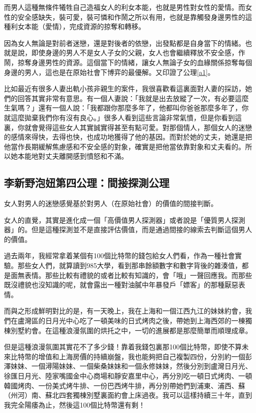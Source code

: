 而男人這種無條件犧牲自己造福女人的利女本能，也就是男性對女性的愛情。而女性的安全感缺失，裝可愛，裝可憐和作鬧之所以有用，也就是靠觸發身邊男性的這種利女本能（愛情），完成資源的掠奪和轉移。

因為女人無論是對前者迷戀，還是對後者的依戀，出發點都是自身當下的情緒。也就是說，即使身邊的男人不是女人子女的父親，女人也會繼續釋放不安全感，作鬧，掠奪身邊男性的資源。這個當下的情緒，讓女人無論子女的血緣關係掠奪每個身邊的男人，這也是在原始社會下博弈的最優解。又印證了公理\ref{a1}。

比如最近有很多人妻出軌小孩非親生的案件，我很喜歡看這裏面對人妻的採訪，她們的回答其實非常有意思。有一個人妻說：「我就是出去放縱了一次，有必要這麼生氣嗎？」還有一個人說：「我都跟你那麼多年了，他都叫你爸爸那麼多年了，你就這麼拋棄我們你有沒有良心。」很多人看到這些言論非常氣憤，但是你看到這裏，你就會覺得這些女人其實誠實得甚至有點可愛。對那個情人，那個女人的迷戀的感情來得快，去得也快，也成功地獲得了他的基因。而對於她的丈夫，她還是把他當作長期緩解焦慮感和不安全感的對象，確實是把他當依靠對象和丈夫看的。所以她本能地對丈夫離開感到憤怒和不滿。

\subsection{李新野泡妞第四公理：間接探測公理}

\begin{axiom}\label{a4}
女人對男人的迷戀感覺基於對男人（在原始社會）的價值的間接判斷。
\end{axiom}

女人的直覺，其實是進化成一個「高價值男人探測器」或者說是「優質男人探測器」的。但是這種探測並不是直接評估價值，而是通過間接的線索去判斷這個男人的價值。

過去兩年，我經常拿着某個有100個比特幣的錢包給女人們看，作為一種社會實驗。那些女人們，就算讀到985大學，看到那串餘額數字和數字背後的雜湊值，都是面無表情。那些比較有禮貌的或者比較有知識的，會「哦」一聲回應我。而那些既沒禮貌也沒知識的呢，就會露出一種對油膩中年暴發戶「嫖客」的那種厭惡表情。

而與之形成鮮明對比的是，有一天晚上，我在上海和一個江西九江的妹妹約會，我們在盧灣區的日月光中心吃了一頓美味的日式烤肉之後，帶她到上海西郊的一棟獨棟別墅約會。在這種浪漫氛圍的烘托之中，一切的進展都是那麼簡單而順理成章。

但是這種浪漫氛圍其實花不了多少錢！靠着我錢包裏那100個比特幣，即使不算未來比特幣的增值和上海房價的持續崩盤，我也能夠把自己複製四份，分別約一個彭澤妹妹、一個潯陽妹妹、一個柴桑妹妹和一個永修妹妹，然後分別到盧灣日月光、徐匯日月光、陸家嘴國金中心商場和靜安嘉里中心，再分別吃一頓日式烤肉、一頓韓國烤肉、一份美式烤牛排、一份巴西烤牛排，再分別帶她們到浦東、浦西、蘇（州河）南、蘇北四套獨棟別墅裏面約會上床過夜。我可以這樣持續三十年，直到我完全陽痿為止，然後這100個比特幣還有剩！


